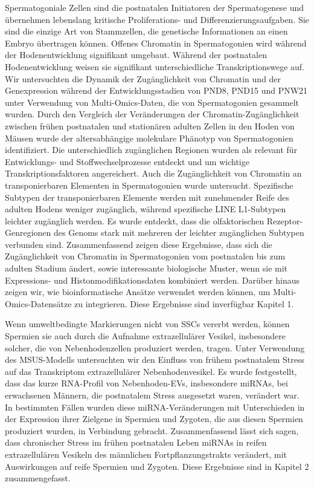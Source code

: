 \documentclass[12pt,twoside]{reedthesis}
\begin{document}
Spermatogoniale Zellen sind die postnatalen Initiatoren der Spermatogenese und übernehmen lebenslang kritische Proliferations- und Differenzierungsaufgaben. Sie sind die einzige Art von Stammzellen, die genetische Informationen an einen Embryo übertragen können. Offenes Chromatin in Spermatogonien wird während der Hodenentwicklung signifikant umgebaut. Während der postnatalen Hodenentwicklung weisen sie signifikant unterschiedliche Transkriptionswege auf. Wir untersuchten die Dynamik der Zugänglichkeit von Chromatin und der Genexpression während der Entwicklungsstadien von PND8, PND15 und PNW21 unter Verwendung von Multi-Omics-Daten, die von Spermatogonien gesammelt wurden. Durch den Vergleich der Veränderungen der Chromatin-Zugänglichkeit zwischen frühen postnatalen und stationären adulten Zellen in den Hoden von Mäusen wurde der altersabhängige molekulare Phänotyp von Spermatogonien identifiziert. Die unterschiedlich zugänglichen Regionen wurden als relevant für Entwicklungs- und Stoffwechselprozesse entdeckt und um wichtige Transkriptionsfaktoren angereichert. Auch die Zugänglichkeit von Chromatin an transponierbaren Elementen in Spermatogonien wurde untersucht. Spezifische Subtypen der transponierbaren Elemente werden mit zunehmender Reife des adulten Hodens weniger zugänglich, während spezifische LINE L1-Subtypen leichter zugänglich werden. Es wurde entdeckt, dass die olfaktorischen Rezeptor-Genregionen des Genoms stark mit mehreren der leichter zugänglichen Subtypen verbunden sind. Zusammenfassend zeigen diese Ergebnisse, dass sich die Zugänglichkeit von Chromatin in Spermatogonien vom postnatalen bis zum adulten Stadium ändert, sowie interessante biologische Muster, wenn sie mit Expressions- und Histonmodifikationsdaten kombiniert werden. Darüber hinaus zeigen wir, wie bioinformatische Ansätze verwendet werden können, um Multi-Omics-Datensätze zu integrieren. Diese Ergebnisse sind inverfügbar Kapitel 1.

Wenn umweltbedingte Markierungen nicht von SSCs vererbt werden, können Spermien sie auch durch die Aufnahme extrazellulärer Vesikel, insbesondere solcher, die von Nebenhodenzellen produziert werden, tragen. Unter Verwendung des MSUS-Modells untersuchten wir den Einfluss von frühem postnatalem Stress auf das Transkriptom extrazellulärer Nebenhodenvesikel. Es wurde festgestellt, dass das kurze RNA-Profil von Nebenhoden-EVs, insbesondere miRNAs, bei erwachsenen Männern, die postnatalem Stress ausgesetzt waren, verändert war. In bestimmten Fällen wurden diese miRNA-Veränderungen mit Unterschieden in der Expression ihrer Zielgene in Spermien und Zygoten, die aus diesen Spermien produziert wurden, in Verbindung gebracht. Zusammenfassend lässt sich sagen, dass chronischer Stress im frühen postnatalen Leben miRNAs in reifen extrazellulären Vesikeln des männlichen Fortpflanzungstrakts verändert, mit Auswirkungen auf reife Spermien und Zygoten. Diese Ergebnisse sind in Kapitel 2 zusammengefasst.
\end{document}
